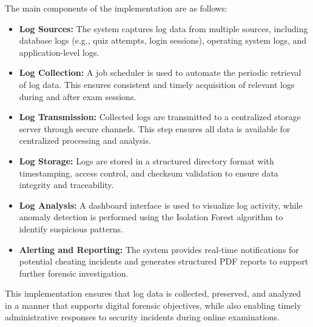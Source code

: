 The main components of the implementation are as follows:

\begin{itemize}
    \item \textbf{Log Sources:} The system captures log data from multiple sources, including database logs (e.g., quiz attempts, login sessions), operating system logs, and application-level logs.

    \item \textbf{Log Collection:} A job scheduler is used to automate the periodic retrieval of log data. This ensures consistent and timely acquisition of relevant logs during and after exam sessions.

    \item \textbf{Log Transmission:} Collected logs are transmitted to a centralized storage server through secure channels. This step ensures all data is available for centralized processing and analysis.

    \item \textbf{Log Storage:} Logs are stored in a structured directory format with timestamping, access control, and checksum validation to ensure data integrity and traceability.

    \item \textbf{Log Analysis:} A dashboard interface is used to visualize log activity, while anomaly detection is performed using the Isolation Forest algorithm to identify suspicious patterns.

    \item \textbf{Alerting and Reporting:} The system provides real-time notifications for potential cheating incidents and generates structured PDF reports to support further forensic investigation.
\end{itemize}

This implementation ensures that log data is collected, preserved, and analyzed in a manner that supports digital forensic objectives, while also enabling timely administrative responses to security incidents during online examinations.

